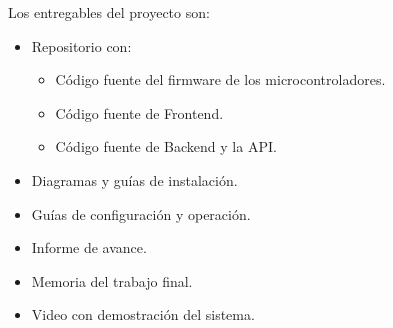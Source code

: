 Los entregables del proyecto son:
\begin{itemize}
	\item Repositorio con:
	      \begin{itemize}
		      \item Código fuente del firmware de los microcontroladores.
		      \item Código fuente de Frontend.
		      \item Código fuente de Backend y la API.
	      \end{itemize}
	\item Diagramas y guías de instalación.
	\item Guías de configuración y operación.
	\item Informe de avance.
	\item Memoria del trabajo final.
	\item Video con demostración del sistema.
\end{itemize}